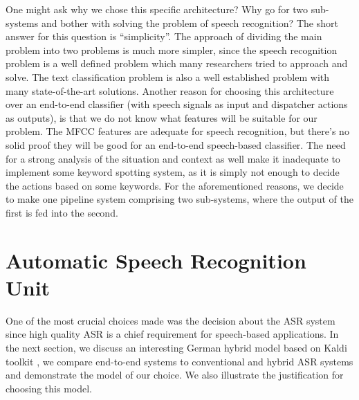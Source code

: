 One might ask why we chose this specific architecture? Why go for two sub-systems and bother with solving the problem of speech recognition? The short answer for this question is \enquote{simplicity}. The approach of dividing the main problem into two problems is much more simpler, since the speech recognition problem is a well defined problem which many researchers tried to approach and solve. The text classification problem is also a well established problem with many state-of-the-art solutions. Another reason for choosing this architecture over an end-to-end classifier (with speech signals as input and dispatcher actions as outputs), is that we do not know what features will be suitable for our problem. The \ac{MFCC} features are adequate for speech recognition, but there's no solid proof they will be good for an end-to-end speech-based classifier. The need for a strong analysis of the situation and context as well make it inadequate to implement some keyword spotting system, as it is simply not enough to decide the actions based on some keywords. For the aforementioned reasons, we decide to make one pipeline system comprising two sub-systems, where the output of the first is fed into the second.








































\section{Automatic Speech Recognition Unit} 
\label{meth:s2}

One of the most crucial choices made was the decision about the \ac{ASR} system since high quality \ac{ASR} is a chief requirement for speech-based applications. In the next section, we discuss an interesting German hybrid model based on Kaldi toolkit \cite{daniel2011kaldi}, we compare end-to-end systems to conventional and hybrid \ac{ASR} systems and demonstrate the model of our choice. We also illustrate the justification for choosing this model.

